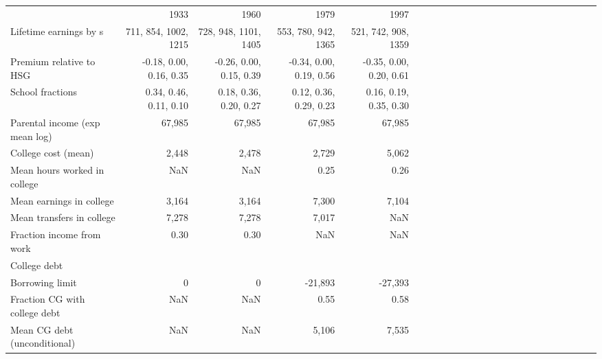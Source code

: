 \begin{tabular}{lrrrrrrrrrrrrrrrrrrrrrrr}
\hline
 & 1933  & 1960  & 1979  & 1997  &   &   &   &   &   &   &   &   &   &   &   &   &   &   &   &   &   &   &   \\ 
Lifetime earnings by s & 711, 854, 1002, 1215  & 728, 948, 1101, 1405  & 553, 780, 942, 1365  & 521, 742, 908, 1359  &   &   &   &   &   &   &   &   &   &   &   &   &   &   &   &   &   &   &   \\ 
Premium relative to HSG & -0.18, 0.00, 0.16, 0.35  & -0.26, 0.00, 0.15, 0.39  & -0.34, 0.00, 0.19, 0.56  & -0.35, 0.00, 0.20, 0.61  &   &   &   &   &   &   &   &   &   &   &   &   &   &   &   &   &   &   &   \\ 
School fractions & 0.34, 0.46, 0.11, 0.10  & 0.18, 0.36, 0.20, 0.27  & 0.12, 0.36, 0.29, 0.23  & 0.16, 0.19, 0.35, 0.30  &   &   &   &   &   &   &   &   &   &   &   &   &   &   &   &   &   &   &   \\ 
Parental income (exp mean log) & 67,985  & 67,985  & 67,985  & 67,985  &   &   &   &   &   &   &   &   &   &   &   &   &   &   &   &   &   &   &   \\ 
College cost (mean) & 2,448  & 2,478  & 2,729  & 5,062  &   &   &   &   &   &   &   &   &   &   &   &   &   &   &   &   &   &   &   \\ 
Mean hours worked in college & NaN  & NaN  & 0.25  & 0.26  &   &   &   &   &   &   &   &   &   &   &   &   &   &   &   &   &   &   &   \\ 
Mean earnings in college & 3,164  & 3,164  & 7,300  & 7,104  &   &   &   &   &   &   &   &   &   &   &   &   &   &   &   &   &   &   &   \\ 
Mean transfers in college & 7,278  & 7,278  & 7,017  & NaN  &   &   &   &   &   &   &   &   &   &   &   &   &   &   &   &   &   &   &   \\ 
Fraction income from work & 0.30  & 0.30  & NaN  & NaN  &   &   &   &   &   &   &   &   &   &   &   &   &   &   &   &   &   &   &   \\ 
College debt &   &   &   &   &   &   &   &   &   &   &   &   &   &   &   &   &   &   &   &   &   &   &   \\ 
Borrowing limit & 0  & 0  & -21,893  & -27,393  &   &   &   &   &   &   &   &   &   &   &   &   &   &   &   &   &   &   &   \\ 
Fraction CG with college debt & NaN  & NaN  & 0.55  & 0.58  &   &   &   &   &   &   &   &   &   &   &   &   &   &   &   &   &   &   &   \\ 
Mean CG debt (unconditional) & NaN  & NaN  & 5,106  & 7,535  &   &   &   &   &   &   &   &   &   &   &   &   &   &   &   &   &   &   &   \\ 
\hline
\end{tabular}%
